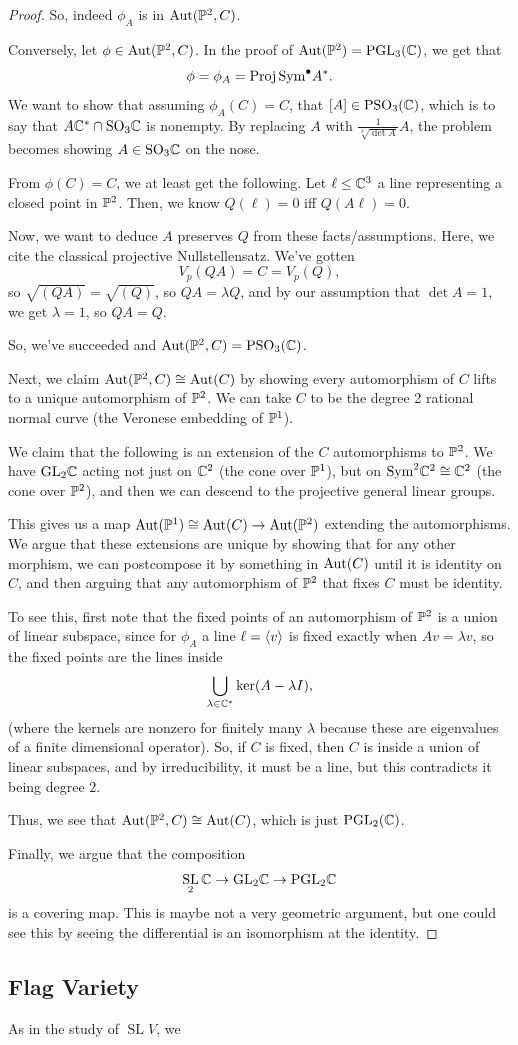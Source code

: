 \documentclass[12pt]{article}
\newcommand{\SO}{\mathrm{SO}}
\DeclareMathOperator{\SL}{SL}
\begin{document}
\begin{proof}
    So, indeed $\phi_A$ is in $\Aut(\P^2,C)$.

    Conversely, let $\phi\in \Aut(\P^2,C)$. In the proof of $\Aut(\P^2)=\mathrm{PGL}_3(\C)$, we get that
    \[\phi = \phi_A = \Proj \Sym^\bullet A^*.\]
    We want to show that assuming $\phi_A(C) = C$, that $[A] \in \mathrm{PSO}_3(\C)$, which is to say that $A\C^* \cap \SO_3 \C$ is nonempty. By replacing $A$ with $\frac{1}{\sqrt[3]{\det A}} A$, the problem becomes showing $A\in \SO_3 \C$ on the nose.

    From $\phi(C) = C$, we at least get the following. Let $\ell\leq \C^3$ a line representing a closed point in $\P^2$. Then, we know $Q(\ell)=0$ iff $Q(A\ell)=0$.

    Now, we want to deduce $A$ preserves $Q$ from these facts/assumptions. Here, we cite the classical projective Nullstellensatz. We've gotten
    \[V_p(QA)=C=V_p(Q),\]
    so $\sqrt{(QA)} = \sqrt{(Q)}$, so $QA = \lambda Q$, and by our assumption that $\det A=1$, we get $\lambda = 1$, so $QA=Q$.

    So, we've succeeded and $\Aut(\P^2,C)=\mathrm{PSO_3}(\C)$.

    Next, we claim $\Aut(\P^2,C) \cong \Aut(C)$ by showing every automorphism of $C$ lifts to a unique automorphism of $\P^2$. We can take $C$ to be the degree 2 rational normal curve (the Veronese embedding of $\P^1$).
    
    We claim that the following is an extension of the $C$ automorphisms to $\P^2$. We have $\GL_2 \C$ acting not just on $\C^2$ (the cone over $\P^1$), but on $\Sym^2 \C^2\cong \C^2$ (the cone over $\P^2$), and then we can descend to the projective general linear groups.

    This gives us a map $\Aut(\P^1)\cong\Aut(C) \to \Aut(\P^2)$ extending the automorphisms. We argue that these extensions are unique by showing that for any other morphism, we can postcompose it by something in $\Aut(C)$ until it is identity on $C$, and then arguing that any automorphism of $\P^2$ that fixes $C$ must be identity.
    
    To see this, first note that the fixed points of an automorphism of $\P^2$ is a union of linear subspace, since for $\phi_A$ a line $\ell=\<v\>$ is fixed exactly when $Av=\lambda v$, so the fixed points are the lines inside
    \[\bigcup_{\lambda\in \C^*} \ker(A-\lambda I),\]
    (where the kernels are nonzero for finitely many $\lambda$ because these are eigenvalues of a finite dimensional operator). So, if $C$ is fixed, then $C$ is inside a union of linear subspaces, and by irreducibility, it must be a line, but this contradicts it being degree 2.

    Thus, we see that $\Aut(\P^2,C)\cong \Aut(C)$, which is just $\mathrm{PGL}_2(\C)$.

    Finally, we argue that the composition
    \[\SL_2 \C \to \GL_2 \C \to \mathrm{PGL}_2 \C\]
    is a covering map. This is maybe not a very geometric argument, but one could see this by seeing the differential is an isomorphism at the identity.
\end{proof}

\subsection{Flag Variety}

As in the study of $\SL V$, we 
\end{document}

